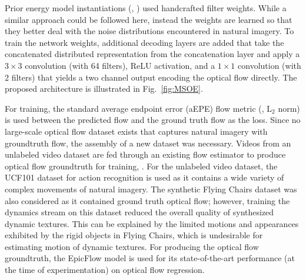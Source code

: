 {Prior energy model instantiations (\eg,
\cite{adelson1985spatiotemporal,derpanis2012spacetime,simoncelli1998})
used handcrafted filter weights.
While a similar approach could be followed here, instead the weights
are learned so that they better deal with the noise distributions encountered in natural imagery.
To train the network weights, additional decoding
layers are added that take the concatenated distributed
representation from the concatenation layer and apply a $3\times 3$ convolution
(with 64 filters), ReLU activation, and a $1\times 1$
convolution (with 2 filters) that yields a two channel
output encoding the optical flow directly.
The proposed architecture is illustrated in
Fig.\ \ref{fig:MSOE}.



For training, the standard average
endpoint error (aEPE) flow metric (\ie, $\text{L}_2$
norm) is used between the predicted flow and the ground truth
flow as the loss.
Since no large-scale optical flow dataset exists that captures
natural imagery with groundtruth flow, the assembly of a new dataset was necessary. Videos
from an unlabeled video dataset are fed through an existing flow
estimator to produce optical
flow groundtruth for training,
\cf \cite{tran2016}.
For the unlabeled video dataset, the UCF101
dataset for action recognition \cite{soomro2012ucf101} is used as it contains a wide variety of complex movements of natural imagery. The synthetic Flying Chairs dataset \cite{dosovitskiy2015} was also considered as it contained ground truth optical flow; however, training the dynamics stream on this dataset reduced the overall quality of synthesized dynamic textures. This can be explained by the limited motions and appearances exhibited by the rigid objects in Flying Chairs, which is undesirable for estimating motion of dynamic textures.
For producing the optical flow groundtruth, the EpicFlow \cite{revaud2015epicflow} model is used for 
its state-of-the-art performance (at the time of experimentation) on optical flow regression.

}
